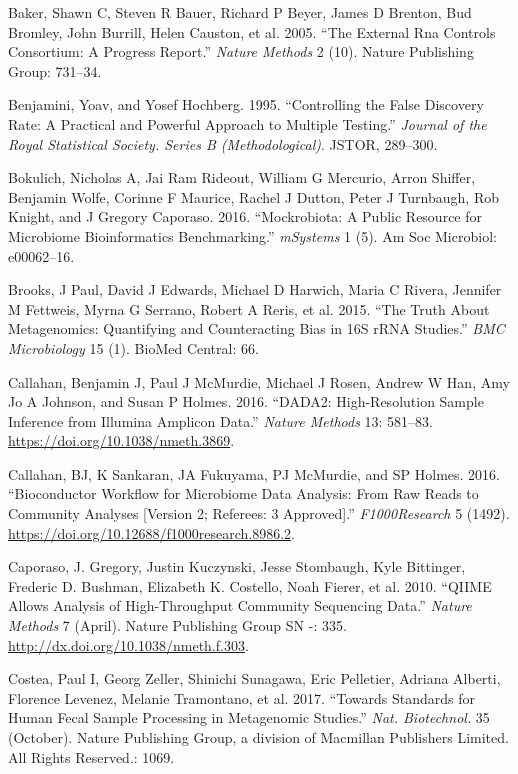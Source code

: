 \documentclass[smallextended]{svjour3}       %
\begin{document}
\leavevmode\hypertarget{ref-baker2005external}{}%
Baker, Shawn C, Steven R Bauer, Richard P Beyer, James D Brenton, Bud
Bromley, John Burrill, Helen Causton, et al. 2005. ``The External Rna
Controls Consortium: A Progress Report.'' \emph{Nature Methods} 2 (10).
Nature Publishing Group: 731--34.

\leavevmode\hypertarget{ref-benjamini1995controlling}{}%
Benjamini, Yoav, and Yosef Hochberg. 1995. ``Controlling the False
Discovery Rate: A Practical and Powerful Approach to Multiple Testing.''
\emph{Journal of the Royal Statistical Society. Series B
(Methodological)}. JSTOR, 289--300.

\leavevmode\hypertarget{ref-bokulich2016mockrobiota}{}%
Bokulich, Nicholas A, Jai Ram Rideout, William G Mercurio, Arron
Shiffer, Benjamin Wolfe, Corinne F Maurice, Rachel J Dutton, Peter J
Turnbaugh, Rob Knight, and J Gregory Caporaso. 2016. ``Mockrobiota: A
Public Resource for Microbiome Bioinformatics Benchmarking.''
\emph{mSystems} 1 (5). Am Soc Microbiol: e00062--16.

\leavevmode\hypertarget{ref-brooks2015truth}{}%
Brooks, J Paul, David J Edwards, Michael D Harwich, Maria C Rivera,
Jennifer M Fettweis, Myrna G Serrano, Robert A Reris, et al. 2015. ``The
Truth About Metagenomics: Quantifying and Counteracting Bias in 16S rRNA
Studies.'' \emph{BMC Microbiology} 15 (1). BioMed Central: 66.

\leavevmode\hypertarget{ref-callahan2016dada2}{}%
Callahan, Benjamin J, Paul J McMurdie, Michael J Rosen, Andrew W Han,
Amy Jo A Johnson, and Susan P Holmes. 2016. ``DADA2: High-Resolution
Sample Inference from Illumina Amplicon Data.'' \emph{Nature Methods}
13: 581--83. \url{https://doi.org/10.1038/nmeth.3869}.

\leavevmode\hypertarget{ref-callahan2016}{}%
Callahan, BJ, K Sankaran, JA Fukuyama, PJ McMurdie, and SP Holmes. 2016.
``Bioconductor Workflow for Microbiome Data Analysis: From Raw Reads to
Community Analyses {[}Version 2; Referees: 3 Approved{]}.''
\emph{F1000Research} 5 (1492).
\url{https://doi.org/10.12688/f1000research.8986.2}.

\leavevmode\hypertarget{ref-Caporaso2010}{}%
Caporaso, J. Gregory, Justin Kuczynski, Jesse Stombaugh, Kyle Bittinger,
Frederic D. Bushman, Elizabeth K. Costello, Noah Fierer, et al. 2010.
``QIIME Allows Analysis of High-Throughput Community Sequencing Data.''
\emph{Nature Methods} 7 (April). Nature Publishing Group SN -: 335.
\url{http://dx.doi.org/10.1038/nmeth.f.303}.

\leavevmode\hypertarget{ref-Costea2017}{}%
Costea, Paul I, Georg Zeller, Shinichi Sunagawa, Eric Pelletier, Adriana
Alberti, Florence Levenez, Melanie Tramontano, et al. 2017. ``Towards
Standards for Human Fecal Sample Processing in Metagenomic Studies.''
\emph{Nat. Biotechnol.} 35 (October). Nature Publishing Group, a
division of Macmillan Publishers Limited. All Rights Reserved.: 1069.
\end{document}
